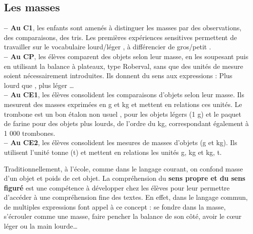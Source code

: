 {\subsection{Les masses} %

{\bf -- Au C1}, les enfants sont amenés à distinguer les masses par des observations, des comparaisons, des tris. Les premières expériences sensitives permettent de travailler sur le vocabulaire \og lourd/léger \fg, à différencier de \og gros/petit \fg. \\
{\bf -- Au CP}, les élèves comparent des objets selon leur masse, en les soupesant puis en utilisant la balance à plateaux, type Roberval, sans que des unités de mesure soient nécessairement introduites. Ils donnent du sens aux expressions : \og Plus lourd que \fg, \og plus léger \fg\dots \\
{\bf -- Au CE1}, les élèves consolident les comparaisons d’objets selon leur masse. Ils mesurent des masses exprimées en g et kg et mettent en relations ces unités. Le trombone est un bon étalon \og non usuel \fg, pour les objets légers (1 g) et le paquet de farine pour des objets plus lourds, de l'ordre du kg, correspondant également à 1 000 trombones. \\
{\bf -- Au CE2}, les élèves consolident les mesures de masses d’objets (g et kg). Ils utilisent l’unité tonne (t) et mettent en relations les unités g, kg et kg, t.  \medskip

 Traditionnellement, à l'école, comme dans le langage courant, on confond masse d'un objet et poids de cet objet. La compréhension du {\bf sens propre et du sens figuré} est une compétence à développer chez les élèves pour leur permettre d’accéder à une compréhension fine des textes. En effet, dans le langage commun, de multiples expressions font appel à ce concept : se fondre dans la masse, s'écrouler comme une masse, faire pencher la balance de son côté, avoir le c\oe ur léger ou la main lourde\dots \medskip
   
}

